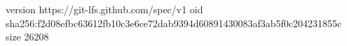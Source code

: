 version https://git-lfs.github.com/spec/v1
oid sha256:f2d08efbc63612fb10c3e6ce72dab9394d60891430083af3ab5f0c204231855c
size 26208
